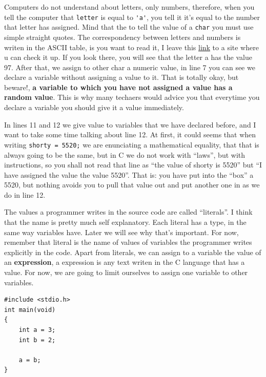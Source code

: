 \documentclass[a4paper]{article}
\begin{document}
Computers do not understand about letters, only numbers, therefore, when you
tell the computer that \verb!letter! is equal to \verb!'a'!, you tell it it's
equal to the number that letter has assigned. Mind that the to tell the value
of a \verb!char! you must use simple straight quotes. The correspondency between
letters and numbers is writen in the ASCII table, is you want to read it, I
leave this \href{https://www.ascii-code.com/}{link} to a site where u can
check it up. If you look there, you will see that the letter a has the value
97. After that, we assign to other char a numeric value, in line 7 you can see
we declare a variable without assigning a value to it. That is totally okay, but
beware!, \textbf{a variable to which you have not assigned a value has a random
value}. This is why many techaers would advice you that everytime you declare a
variable you should give it a value immediately.

In lines 11 and 12 we give value to variables that we have declared before,
and I want to take some time talking about line 12. At first, it could seems
that when writing \verb!shorty = 5520;! we are enunciating a mathematical
equality, that that is always going to be the same, but in C we do not work with
``laws'', but with instructions, so you shall not read that line as ``the value
of shorty is 5520'' but ``I have assigned the value the value 5520''. That is:
you have put into the ``box'' a 5520, but nothing avoids you to pull that
value out and put another one in as we do in line 12.

The values a programmer writes in the source code are called ``literals''. I
think that the name is pretty much self explanatory. Each literal has a type,
in the same way variables have. Later we will see why that's important. For now,
remember that literal is the name of values of variables the programmer writes
explicitly in the code. Apart from literals, we can assign to a variable the
value of an \textbf{expression}, a expression is any text writen in the C
language that has a value. For now, we are going to limit ourselves to assign
one variable to other variables.

\noindent
\begin{minipage}[H]{\linewidth}
\mbox{}
\begin{lstlisting}[style=C, caption={Assigning variables to other variables},
label={lst:variableAsignationBetween}]
#include <stdio.h>
int main(void)
{
    int a = 3;
    int b = 2;

    a = b;
}
\end{lstlisting}
\end{minipage}
\end{document}

